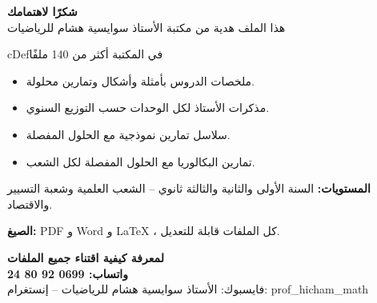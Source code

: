 \documentclass[12pt,a4paper]{article}
\newenvironment{BOX}[2]{\begin{otherlanguage}{english}\begin{arbox}{#1}{#2}}{\end{arbox}\end{otherlanguage}}
\newenvironment{LTR}{\begin{otherlanguage}{english}}{\end{otherlanguage}}
\begin{document}
\vspace*{2cm}
\begin{LTR}
\begin{tcolorbox}[enhanced,colback=cSec,colframe=cSec,arc=4mm,halign=center,boxrule=0pt,top=16pt,bottom=16pt,before upper={\selectlanguage{arabic}}]
{\color{white}\fontsize{26}{32}\selectfont\bfseries شكرًا لاهتمامك}\\[10pt]
{\color{white}\Large هذا الملف هدية من مكتبة الأستاذ سوايسية هشام للرياضيات}
\end{tcolorbox}
\end{LTR}
\vspace{8pt}
\begin{BOX}{cDef}{في المكتبة أكثر من 140 ملفًا}
\begin{itemize}
\item ملخصات الدروس بأمثلة وأشكال وتمارين محلولة.
\item مذكرات الأستاذ لكل الوحدات حسب التوزيع السنوي.
\item سلاسل تمارين نموذجية مع الحلول المفصلة.
\item تمارين البكالوريا مع الحلول المفصلة لكل الشعب.
\end{itemize}
\textbf{المستويات:} السنة الأولى والثانية والثالثة ثانوي -- الشعب العلمية وشعبة التسيير والاقتصاد.\par
\textbf{الصيغ:} PDF و Word و LaTeX ، كل الملفات قابلة للتعديل.
\end{BOX}
\begin{LTR}
\begin{tcolorbox}[enhanced,colback=cRem!8,colframe=cRem,arc=3mm,halign=center,boxrule=1.2pt,top=12pt,bottom=12pt,before upper={\selectlanguage{arabic}}]
{\Large\bfseries لمعرفة كيفية اقتناء جميع الملفات}\\[8pt]
{\color{cRem!80!black}\fontsize{24}{30}\selectfont\bfseries واتساب: \foreignlanguage{english}{0699 92 80 24}}\\[8pt]
{\large فايسبوك: الأستاذ سوايسية هشام للرياضيات \quad -- \quad إنستغرام: prof\_hicham\_math}
\end{tcolorbox}
\end{LTR}
\end{document}
